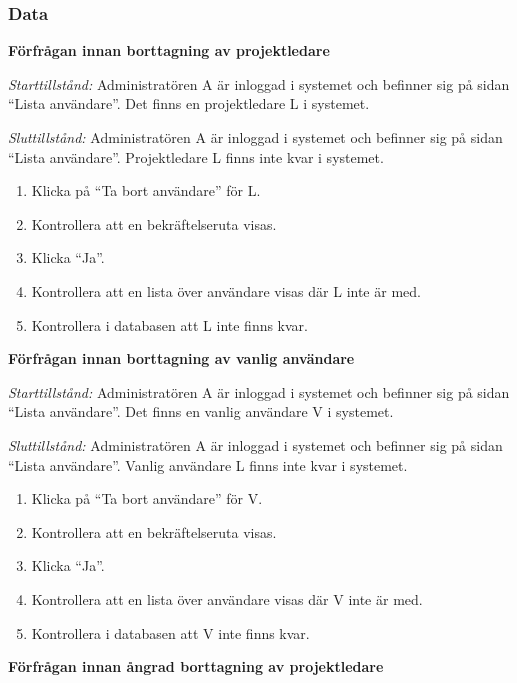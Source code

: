 \documentclass[a4paper]{article}
\begin{document}
\subsubsection{Data}
\begin{FT}
\item \textbf{Förfrågan innan borttagning av projektledare}

\emph{Starttillstånd:} Administratören A är inloggad i systemet och befinner sig på sidan ``Lista användare''. Det finns en projektledare L i systemet.

\emph{Sluttillstånd:} Administratören A är inloggad i systemet och befinner sig på sidan ``Lista användare''. Projektledare L finns inte kvar i systemet.

\begin{enumerate}
\item Klicka på ``Ta bort användare'' för L.
\item Kontrollera att en bekräftelseruta visas.
\item Klicka ``Ja''.
\item Kontrollera att en lista över användare visas där L inte är med.
\item Kontrollera i databasen att L inte finns kvar.
\end{enumerate}

\item \textbf{Förfrågan innan borttagning av vanlig användare}

\emph{Starttillstånd:} Administratören A är inloggad i systemet och befinner sig på sidan ``Lista användare''. Det finns en vanlig användare V i systemet.

\emph{Sluttillstånd:} Administratören A är inloggad i systemet och befinner sig på sidan ``Lista användare''. Vanlig användare L finns inte kvar i systemet.

\begin{enumerate}
\item Klicka på ``Ta bort användare'' för V.
\item Kontrollera att en bekräftelseruta visas.
\item Klicka ``Ja''.
\item Kontrollera att en lista över användare visas där V inte är med.
\item Kontrollera i databasen att V inte finns kvar.
\end{enumerate}

\item \textbf{Förfrågan innan ångrad borttagning av projektledare}


\end{FT}
\end{document}
